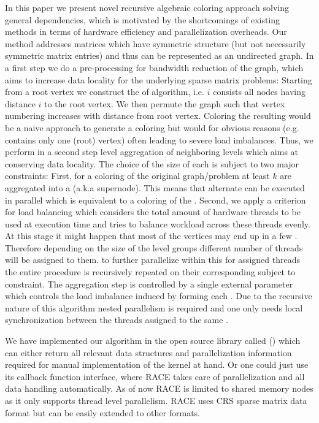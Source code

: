 In this paper we present novel recursive algebraic coloring approach solving general \DK dependencies, which is motivated by the shortcomings of existing \MC methods in terms of hardware efficiency and parallelization overheads. Our method addresses matrices which have symmetric structure (but not necessarily symmetric matrix entries) and thus can be represented as an undirected graph. In a first step we do a \BFS pre-processing for bandwidth reduction of the graph, which aims to increase data locality for the underlying sparse matrix problems: Starting from a root vertex we construct the \levels of \BFS algorithm, i.e. \level $i$ consists all nodes having distance $i$ to the root vertex. We then permute the graph such that vertex numbering increases with distance from root vertex. Coloring the resulting \levels would be a naive approach to generate a \DK coloring but would for obvious reasons (e.g.  contains only one (root) vertex) often leading to severe load imbalances. Thus, we perform in a second step level aggregation of neighboring levels which aims at conserving data locality. The choice of the size of each \levelGroup is subject to two major constraints: First, for a \DK coloring of the original graph/problem at least $k$ \levels are aggregated into a \levelGroup (a.k.a supernode). This means that alternate \levelGroups can be executed in parallel which is equivalent to a \DONE coloring of the \levelGroups. Second, we apply a criterion for load balancing which considers the total amount of hardware threads to be used at execution time and tries to balance workload across these threads evenly. At this stage it might happen that most of the vertices may end up in a few \levelGroups. Therefore depending on the size of the level groups different number of threads will be assigned to them. \Inorder to further parallelize within this \levelGroup for assigned threads the entire procedure is recursively repeated on their corresponding \subgraph subject to \DK constraint. The aggregation step is controlled by a single external parameter which controls the load imbalance induced by forming each \levelGroup. Due to the recursive nature of this algorithm nested parallelism is required and one only needs local synchronization between the threads assigned to the same \subgraph.

We have implemented our algorithm in the open source library called \RACE (\RACEfull) which can either return all relevant data structures and parallelization information required for manual implementation of the kernel at hand. Or one could just use its callback function interface, where RACE takes care of parallelization and all data handling automatically. As of now RACE is limited to shared memory nodes as it only supports thread level parallelism. RACE uses CRS sparse matrix data format but can be easily extended to other formats.

